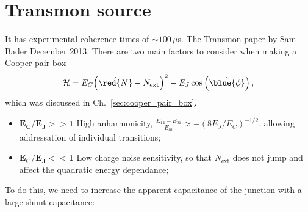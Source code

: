 \section{Transmon source\label{sec:transmon}}
 It has experimental coherence times of $ \sim 100\,\mu $s. The Transmon paper by Sam Bader December 2013. There are two main factors to consider when making a Cooper pair box
 \begin{equation}\label{key}
 	\mathcal{H} = E_C{\left(\hat{\red{N}}-N_\text{ext}\right)^2}- E_J\cos\left(\hat{\blue{\phi}}\right),
 \end{equation}
 \noindent which was discussed in Ch.~\ref{sec:cooper_pair_box}.
 
 \begin{itemize}
 	\item $ \mathbf{E_C/E_J >> 1 }$ {High anharmonicity, $  		\frac{E_{12} - E_{01}}{E_{01}}\approx -(8E_J/E_C)^{-1/2} $, allowing addressation of individual transitions};
 	\item $ \mathbf{E_C/E_J <<1 }$ {Low charge noise sensitivity, so that $ N_\text{ext} $ does not jump and affect the quadratic energy dependance};
 \end{itemize}

 \noindent {} To do this, we need to increase the apparent capacitance of the junction with a large shunt capacitance:
 
 
 
 \newpage